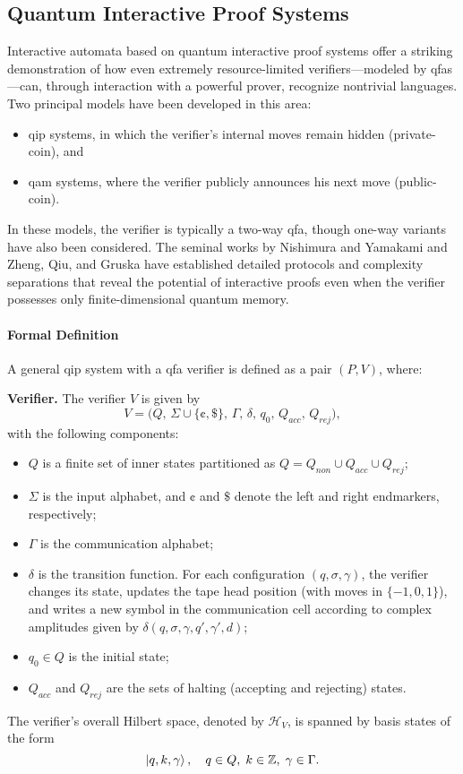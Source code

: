 \subsection{Quantum Interactive Proof Systems}
\label{sec:interactive-automata}

Interactive automata based on quantum interactive proof systems offer a striking demonstration of how even extremely resource-limited verifiers—modeled by \glspl{qfa}—can, through interaction with a powerful prover, recognize nontrivial languages. Two principal models have been developed in this area:
  
\begin{itemize}
  \item \gls{qip} systems, in which the verifier's internal moves remain hidden (private-coin), and
  \item \gls{qam} systems, where the verifier publicly announces his next move (public-coin).
\end{itemize}

In these models, the verifier is typically a two-way qfa, though one-way variants have also been considered. The seminal works by Nishimura and Yamakami \cite{nishimura2009application, nishimura2015interactive} and Zheng, Qiu, and Gruska \cite{zheng2015power} have established detailed protocols and complexity separations that reveal the potential of interactive proofs even when the verifier possesses only finite-dimensional quantum memory.

\paragraph{Formal Definition}
A general \gls{qip} system with a qfa verifier is defined as a pair $(P,V)$, where:

\textbf{Verifier.} The verifier $V$ is given by
\[
V = \bigl(Q,\, \Sigma \cup \{\cent,\$\},\, \Gamma,\, \delta,\, q_0,\, Q_{acc},\, Q_{rej}\bigr),
\]
with the following components:
\begin{itemize}
  \item $Q$ is a finite set of inner states partitioned as $Q = Q_{non} \cup Q_{acc} \cup Q_{rej}$;
  \item $\Sigma$ is the input alphabet, and $\cent$ and $\$$ denote the left and right endmarkers, respectively;
  \item $\Gamma$ is the communication alphabet;
  \item $\delta$ is the transition function. For each configuration $(q,\sigma,\gamma)$, the verifier changes its state, updates the tape head position (with moves in $\{-1,0,1\}$), and writes a new symbol in the communication cell according to complex amplitudes given by $\delta(q,\sigma,\gamma,q',\gamma',d)$;
  \item $q_0\in Q$ is the initial state;
  \item $Q_{acc}$ and $Q_{rej}$ are the sets of halting (accepting and rejecting) states.
\end{itemize}
The verifier's overall Hilbert space, denoted by $\mathit{\mathcal{H}}_V$, is spanned by basis states of the form
\[
\ket{q, k, \gamma},\quad q\in Q,\; k\in \mathbb{Z},\; \gamma\in\Gamma.
\]

